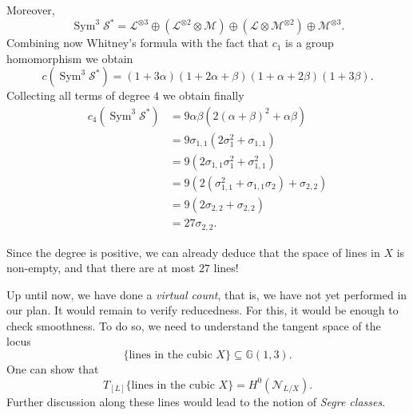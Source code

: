 \documentclass[12pt,a4paper]{amsart}
\theoremstyle{plain}
\theoremstyle{definition}
\theoremstyle{remark}
\begin{document}
Moreover,
\[ \operatorname{Sym}^{3}\mathscr{S}^{*} = \mathscr{L}^{\otimes 3} \oplus (\mathscr{L}^{\otimes 2} \otimes \mathscr{M}) \oplus (\mathscr{L}\otimes \mathscr{M}^{\otimes 2}) \oplus \mathscr{M}^{\otimes 3}. \]
Combining now Whitney's formula with the fact that $c_{1}$ is a group homomorphism we obtain
\[ c(\operatorname{Sym}^{3}\mathscr{S}^{*}) = (1 + 3\alpha)(1 + 2 \alpha + \beta)(1 + \alpha + 2\beta)(1 + 3 \beta). \]
Collecting all terms of degree $4$ we obtain finally
\begin{align*}
  c_{4}(\operatorname{Sym}^{3}\mathscr{S}^{*}) & = 9\alpha\beta(2(\alpha + \beta)^{2} + \alpha\beta) \\
  & = 9 \sigma_{1,1} (2 \sigma_{1}^{2} + \sigma_{1,1}) \\
  & = 9 (2 \sigma_{1,1}\sigma_{1}^{2} + \sigma_{1,1}^{2}) \\
  & = 9 (2 (\sigma_{1,1}^{2} + \sigma_{1,1}\sigma_{2}) + \sigma_{2,2}) \\
  & = 9 (2 \sigma_{2,2} + \sigma_{2,2}) \\
  & = 27 \sigma_{2,2}.
\end{align*}

Since the degree is positive, we can already deduce that the space of lines in $X$ is non-empty, and that there are at most $27$ lines!

Up until now, we have done a \textit{virtual count}, that is, we have not yet performed \underline{} in our plan.
It would remain to verify reducedness.
For this, it would be enough to check smoothness.
To do so, we need to understand the tangent space of the locus
\[ \{ \text{lines in the cubic } X \} \subseteq \mathbb{G}(1,3). \]
One can show that
\[ T_{[L]}\{ \text{lines in the cubic } X\} = H^{0}(\mathscr{N}_{L/X}). \]
Further discussion along these lines would lead to the notion of \textit{Segre classes}.



\vfill
\end{document}
